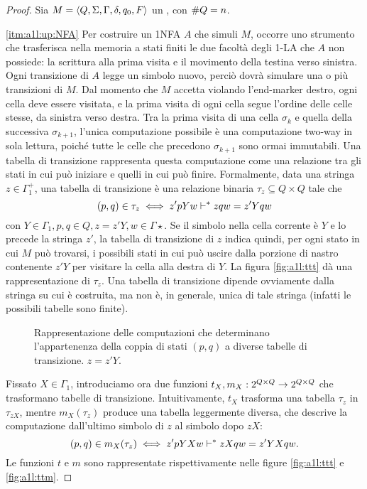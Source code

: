 \begin{proof}
	Sia $M=\langle Q,\Sigma,\Gamma,\delta,q_0,F \rangle$ un , con $\# Q=n$.

	\ref{itm:a1l:up:NFA} Per costruire un 1NFA $A$ che simuli $M$, occorre uno strumento che trasferisca nella memoria a stati finiti le due facoltà degli 1-LA che $A$ non possiede: la scrittura alla prima visita e il movimento della testina verso sinistra. Ogni transizione di $A$ legge un simbolo nuovo, perciò dovrà simulare una o più transizioni di $M$.
	Dal momento che $M$ accetta violando l'end-marker destro, ogni cella deve essere visitata, e la prima visita di ogni cella segue l'ordine delle celle stesse, da sinistra verso destra. Tra la prima visita di una cella $\sigma_k$ e quella della successiva $\sigma_{k+1}$, l'unica computazione possibile è una computazione two-way in sola lettura, poiché tutte le celle che precedono $\sigma_{k+1}$ sono ormai immutabili. Una tabella di transizione rappresenta questa computazione come una relazione tra gli stati in cui può iniziare e quelli in cui può finire. Formalmente, data una stringa $z\in\Gamma_1^+$, una tabella di transizione è una relazione binaria $\tau_z\subseteq Q\times Q$ tale che
	\begin{equation*}
		(p,q)\in\tau_z \iff z'pYw \vdash^* zqw = z'Yqw
	\end{equation*}
	con $Y\in\Gamma_1,p,q\in Q,z=z'Y,w\in\Gamma\star$. Se il simbolo nella cella corrente è $Y$ e lo precede la stringa $z'$, la tabella di transizione di $z$ indica quindi, per ogni stato in cui $M$ può trovarsi, i possibili stati in cui può uscire dalla porzione di nastro contenente $z'Y$ per visitare la cella alla destra di $Y$. La figura \ref{fig:a1l:ttt} dà una rappresentazione di $\tau_z$. Una tabella di transizione dipende ovviamente dalla stringa su cui è costruita, ma non è, in generale, unica di tale stringa (infatti le possibili tabelle sono finite).

	\begin{figure}
		\centering
		 \qquad
		\caption{Rappresentazione delle computazioni che determinano l'appartenenza della coppia di stati $(p,q)$ a diverse tabelle di transizione. $z=z'Y$.}
	\end{figure}

	Fissato $X\in\Gamma_1$, introduciamo ora due funzioni $t_X,m_X:2^{Q\times Q}\to2^{Q\times Q}$ che trasformano tabelle di transizione. Intuitivamente, $t_X$ trasforma una tabella $\tau_z$ in $\tau_{zX}$, mentre $m_X(\tau_z)$ produce una tabella leggermente diversa, che descrive la computazione dall'ultimo simbolo di $z$ al simbolo dopo $zX$:
	\begin{equation*}
		(p,q)\in m_X(\tau_z) \iff z'pYXw \vdash^* zXqw = z'YXqw\text.
	\end{equation*}
	Le funzioni $t$ e $m$ sono rappresentate rispettivamente nelle figure \ref{fig:a1l:ttt} e \ref{fig:a1l:ttm}.


\end{proof}
